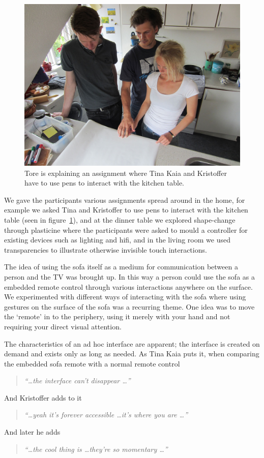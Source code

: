 \begin{figure}[h]
  \centering
  \includegraphics[width=.9\textwidth]{figures/kaia_moos1}
  \caption{Tore is explaining an assignment where Tina Kaia and Kristoffer have to use pens to interact with the kitchen table.}
   \label{kaia_moos1}
\end{figure}

We gave the participants various assignments spread around in the home, for example we asked Tina and Kristoffer to use pens to interact with the kitchen table (seen in figure~\ref{kaia_moos1}), and at the dinner table we explored shape-change through plasticine where the participants were asked to mould a controller for existing devices such as lighting and hifi, and in the living room we used transparencies to illustrate otherwise invisible touch interactions.

The idea of using the sofa itself as a medium for communication between a person and the TV was brought up.
In this way a person could use the sofa as a embedded remote control through various interactions anywhere on the surface.
We experimented with different ways of interacting with the sofa where using gestures on the surface of the sofa was a recurring theme.
One idea was to move the `remote' in to the periphery, using it merely with your hand and not requiring your direct visual attention.

The characteristics of an ad hoc interface are apparent; the interface is created on demand and exists only as long as needed.
As Tina Kaia puts it, when comparing the embedded sofa remote with a normal remote control

\begin{quotation}
  \emph{``\dots the interface can't disappear \dots''}
\end{quotation}
And Kristoffer adds to it
\begin{quotation}
  \emph{``\dots yeah it's forever accessible \dots it's where you are \dots''}
\end{quotation}
And later he adds
\begin{quotation}
  \emph{``\dots the cool thing is \dots they're so momentary \dots''}
\end{quotation}

